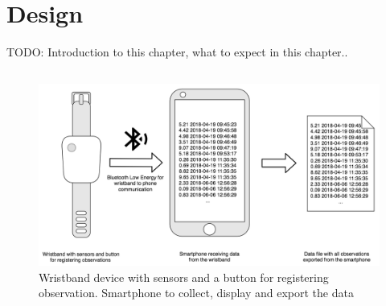 \chapter{Design}
TODO: Introduction to this chapter, what to expect in this chapter..

\section{}

\begin{figure}[h]
    \centering
    \includegraphics[scale=0.35]{figures/design_overview.png}
    \caption{Wristband device with sensors and a button for registering observation. Smartphone to collect, display and export the data}
    \label{design_overview}
\end{figure}